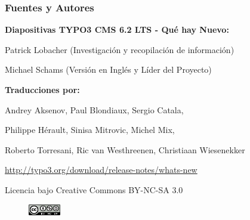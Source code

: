 \begin{frame}[fragile]
	\frametitle{Fuentes y Autores}

	\centerline{\textbf{Diapositivas TYPO3 CMS 6.2 LTS - Qué hay Nuevo:}}
	\centerline{Patrick Lobacher (Investigación y recopilación de información)}
	\centerline{Michael Schams (Versión en Inglés y Líder del Proyecto)}

	\begin{center}
		\centerline{\textbf{Traducciones por:}}
		\centerline{Andrey Aksenov, Paul Blondiaux, Sergio Catala,}
		\centerline{Philippe Hérault, Sinisa Mitrovic, Michel Mix,}
		\centerline{Roberto Torresani, Ric van Westhreenen, Christiaan Wiesenekker}
	\end{center}

	\smaller\begin{center}\url{http://typo3.org/download/release-notes/whats-new}\end{center}\normalsize

	\smaller\begin{center}Licencia bajo Creative Commons BY-NC-SA 3.0\end{center}\normalsize
	\begin{figure}\vspace*{-0.2cm}
		\includegraphics[width=1.4cm]{Images/SourcesAndAuthors/CreativeCommons-BY-NC-SA.png}
	\end{figure}

\end{frame}



